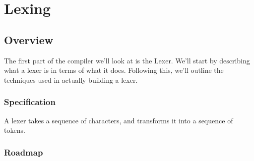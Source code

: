 \chapter{Lexing}

\section{Overview}
The first part of the compiler we'll look at is the Lexer. We'll start by describing what a lexer is in terms of what it does. Following this, we'll outline the techniques used in actually building a lexer.

\subsection{Specification}
A lexer takes a sequence of characters, and transforms it into a sequence of tokens.  

\subsection{Roadmap}